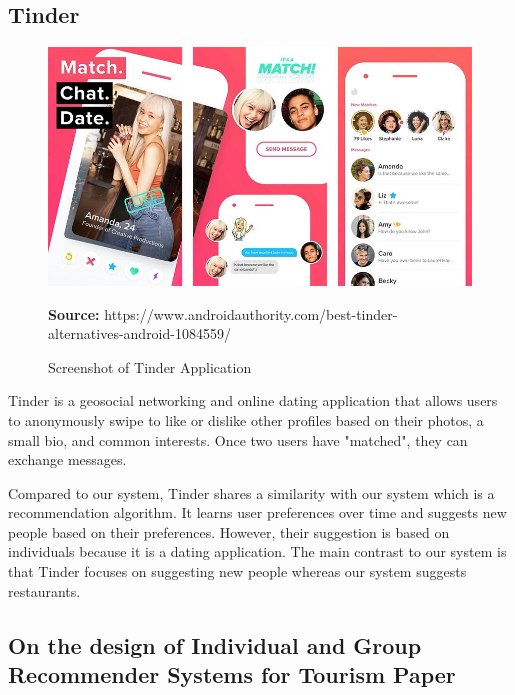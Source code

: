 \documentclass[12pt,oneside,openright,a4paper]{cpe-english-project}
\newcommand*{\captionsource}[2]{%
  \caption[{#1}]{#1}\vspace{-8pt}
  \textbf{Source:} #2}
\begin{document}
\newpage
\subsection{Tinder}

\begin{figure}[H]\centering
\includegraphics[width=400pt]{./images/2tinder.jpeg}
\label{fig:2tinder}
\captionsource{Screenshot of Tinder Application}{https://www.androidauthority.com/best-tinder-alternatives-android-1084559/}
\end{figure}\vspace{-24pt}
\vspace{1em}

Tinder is a geosocial networking and online dating application that allows users to anonymously swipe to like or dislike other profiles based on their photos, a small bio, and common interests. Once two users have "matched", they can exchange messages. \cite{Tinderapp}

Compared to our system, Tinder shares a similarity with our system which is a recommendation algorithm. It learns user preferences over time and suggests new people based on their preferences. However, their suggestion is based on individuals because it is a dating application.  The main contrast to our system is that Tinder focuses on suggesting new people whereas our system suggests restaurants.

\newpage
\subsection{On the design of Individual and Group Recommender Systems for Tourism Paper}
\end{document}
